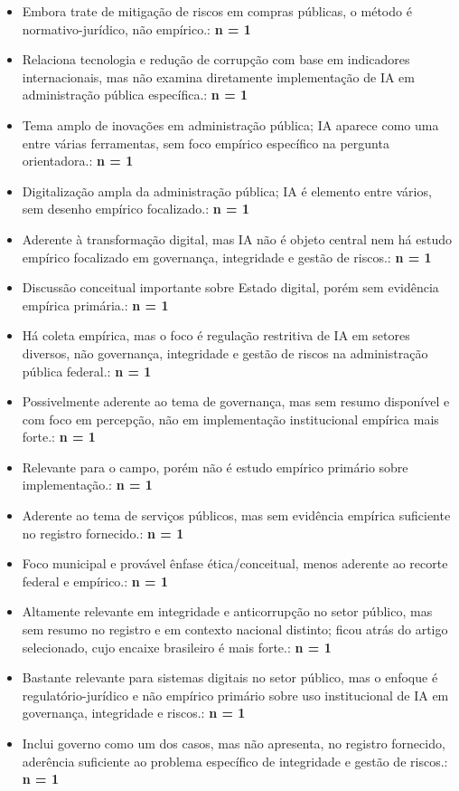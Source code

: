 \documentclass[12pt,a4paper]{article}
\begin{document}
\begin{itemize}
\begin{itemize}
\item Embora trate de mitigação de riscos em compras públicas, o método é normativo-jurídico, não empírico.: \textbf{n = 1}
\item Relaciona tecnologia e redução de corrupção com base em indicadores internacionais, mas não examina diretamente implementação de IA em administração pública específica.: \textbf{n = 1}
\item Tema amplo de inovações em administração pública; IA aparece como uma entre várias ferramentas, sem foco empírico específico na pergunta orientadora.: \textbf{n = 1}
\item Digitalização ampla da administração pública; IA é elemento entre vários, sem desenho empírico focalizado.: \textbf{n = 1}
\item Aderente à transformação digital, mas IA não é objeto central nem há estudo empírico focalizado em governança, integridade e gestão de riscos.: \textbf{n = 1}
\item Discussão conceitual importante sobre Estado digital, porém sem evidência empírica primária.: \textbf{n = 1}
\item Há coleta empírica, mas o foco é regulação restritiva de IA em setores diversos, não governança, integridade e gestão de riscos na administração pública federal.: \textbf{n = 1}
\item Possivelmente aderente ao tema de governança, mas sem resumo disponível e com foco em percepção, não em implementação institucional empírica mais forte.: \textbf{n = 1}
\item Relevante para o campo, porém não é estudo empírico primário sobre implementação.: \textbf{n = 1}
\item Aderente ao tema de serviços públicos, mas sem evidência empírica suficiente no registro fornecido.: \textbf{n = 1}
\item Foco municipal e provável ênfase ética/conceitual, menos aderente ao recorte federal e empírico.: \textbf{n = 1}
\item Altamente relevante em integridade e anticorrupção no setor público, mas sem resumo no registro e em contexto nacional distinto; ficou atrás do artigo selecionado, cujo encaixe brasileiro é mais forte.: \textbf{n = 1}
\item Bastante relevante para sistemas digitais no setor público, mas o enfoque é regulatório-jurídico e não empírico primário sobre uso institucional de IA em governança, integridade e riscos.: \textbf{n = 1}
\item Inclui governo como um dos casos, mas não apresenta, no registro fornecido, aderência suficiente ao problema específico de integridade e gestão de riscos.: \textbf{n = 1}

\end{itemize}
\end{itemize}
\end{document}
